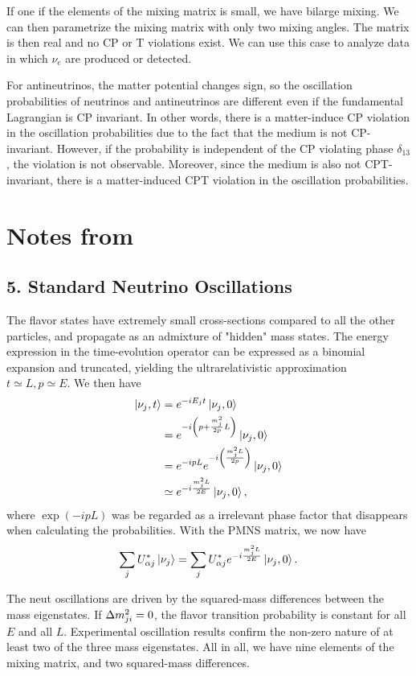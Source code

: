 \documentclass[twocolumn]{article}
\renewcommand{\a}{\ensuremath{\alpha}}
\renewcommand{\ne}{\ensuremath{\nu_e}}
\renewcommand{\t}[1]{\ensuremath{\text{{#1}}}}
\newcommand*{\dm}[1][]{%
  \Delta m^2\ifx\\#1\\\else_\text{#1}\fi
}
\begin{document}
If one if the elements of the mixing matrix is small, we have bilarge mixing. We can then parametrize the mixing matrix with only two mixing angles. The matrix is then real and no CP or T violations exist. We can use this case to analyze data in which $\ne$ are produced or detected.

For antineutrinos, the matter potential changes sign, so the oscillation probabilities of neutrinos and antineutrinos are different even if the fundamental Lagrangian is CP invariant. In other words, there is a matter-induce CP violation in the oscillation probabilities due to the fact that the medium is not CP-invariant. However, if the probability is independent of the CP violating phase $\delta_\t{13}$, the violation is not observable. Moreover, since the medium is also not CPT-invariant, there is a matter-induced CPT violation in the oscillation probabilities. 

\section*{Notes from~\cite{heros2020}}
\subsection{5. Standard Neutrino Oscillations}
The flavor states have extremely small cross-sections compared to all the other particles, and propagate as an admixture of "hidden" mass states. The energy expression in the time-evolution operator can be expressed as a binomial expansion and truncated, yielding the ultrarelativistic approximation $t \simeq L, p \simeq E$. We then have
\begin{align*}
  \ket{\nu_j,t} &= e^{-iE_j t}\ket{\nu_j,0} \\
                &= e^{-i\left( p + \frac{m^2_j}{2p}L \right)}\ket{\nu_j,0} \\
                &= e^{-ipL} e^{-i\left(\frac{m^2_j L}{2p} \right)}\ket{\nu_j,0} \\
                &\simeq e^{-i \frac{m^2_j L}{2E}}\ket{\nu_j,0} 
,\end{align*}   
where $\exp(-ipL)$ was be regarded as a irrelevant phase factor that disappears when calculating the probabilities. With the PMNS matrix, we now have
\begin{align*}
  \sum_j U^*_{\a j}\ket{\nu_j} = \sum_j U^*_{\a j} e^{-i \frac{m^2_j L}{2E}}\ket{\nu_j,0} 
.\end{align*}

The neut oscillations are driven by the squared-mass differences between the mass eigenstates. If $\dm_{ji} = 0$, the flavor transition probability is constant for all $E$ and all $L$. Experimental oscillation results confirm the non-zero nature of at least two of the three mass eigenstates. All in all, we have nine elements of the mixing matrix, and two squared-mass differences.
\end{document}
